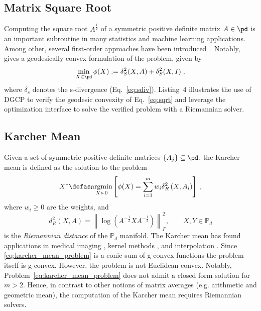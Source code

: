 \documentclass[twoside,11pt]{article}
\begin{document}
\subsection{Matrix Square Root}
Computing the square root $A^{\frac{1}{2}}$ of a symmetric positive definite matrix $A \in \pd$ is an important subroutine in many statistics and machine learning applications. Among other, several first-order approaches have been introduced~\citep{jain2017global,sra2015matrix}. Notably,~\cite{sra2015matrix} gives a geodesically convex formulation of the problem, given by
\begin{equation}\label{eq:sqrt}
    \min _{X \in \pd} \phi(X) := \delta_S^2(X, A)+\delta_S^2(X, I) \; ,
\end{equation}
where $\delta_s$ denotes the s-divergence (Eq.~\ref{eq:sdiv}). Listing~4 %
illustrates the use of DGCP to verify the geodesic convexity of Eq.~\ref{eq:sqrt} and leverage the optimization interface to solve the verified problem with a Riemannian solver.

\subsection{Karcher Mean}\label{sec:karcher_mean}

Given a set of symmetric positive definite matrices $\{A_j\} \subseteq \pd$, the Karcher mean is defined as the solution to the problem
\begin{equation}\label{eq:karcher_mean_problem}
    X^* \defas \underset{X \succ 0}{\operatorname{argmin}}\left[\phi(X)=\sum_{i=1}^m w_i \delta_R^2\left(X, A_i\right)\right] \; ,
\end{equation}
where $w_i \geq 0$ are the weights, and 
\begin{equation}
    d^2_R(X, A) = \left \| \log \left(A^{-\frac{1}{2}}X A^{-\frac{1}{2}} \right)\right \|_F^2,
    \qquad X,Y \in \mathbb{P}_d
\end{equation}
is the \textit{Riemannian distance} of the $\mathbb{P}_d$ manifold. The Karcher mean has found applications in medical imaging \citep{Carmichael2013-wq}, kernel methods \citep{clustering}, and interpolation \citep{absil_interpolation}. Since \eqref{eq:karcher_mean_problem} is a conic sum of g-convex functions the problem itself is g-convex. However, the problem is not Euclidean convex. Notably, Problem~\ref{eq:karcher_mean_problem} does not admit a closed form solution for $m>2$. Hence, in contrast to other notions of matrix averages (e.g. arithmetic and geometric mean), the computation of the Karcher mean requires Riemannian solvers.
\end{document}

